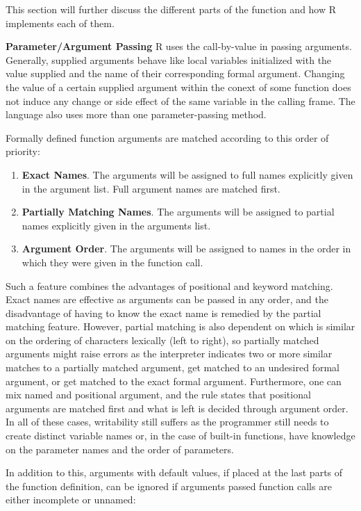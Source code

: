 \documentclass[12pt]{article}
\begin{document}
This section will further discuss the different parts of the function and how R implements each of them.

\textbf{Parameter/Argument Passing} R uses the call-by-value in passing arguments. Generally, supplied arguments behave like local variables initialized with the value supplied and the name of their corresponding formal argument. Changing the value of a certain supplied argument within the conext of some function does not induce any change or side effect of the same variable in the calling frame. The language also uses more than one parameter-passing method.

Formally defined function arguments are matched according to this order of priority:
\begin{enumerate}
\item \textbf{Exact Names}. The arguments will be assigned to full names explicitly given in the argument list. Full argument names are matched first.
\item \textbf{Partially Matching Names}. The arguments will be assigned to partial names explicitly given in the arguments list.
\item \textbf{Argument Order}. The arguments will be assigned to names in the order in which they were given in the function call.
\end{enumerate}

Such a feature combines the advantages of positional and keyword matching. Exact names are effective as arguments can be passed in any order, and the disadvantage of having to know the exact name is remedied by the partial matching feature. However, partial matching is also dependent on which is similar on the ordering of characters lexically (left to right), so partially matched arguments might raise errors as the interpreter indicates two or more similar matches to a partially matched argument, get matched to an undesired formal argument, or get matched to the exact formal argument. Furthermore, one can mix named and positional argument, and the rule states that positional arguments are matched first and what is left is decided through argument order. In all of these cases, writability still suffers as the programmer still needs to create distinct variable names or, in the case of built-in functions, have knowledge on the parameter names and the order of parameters.

In addition to this, arguments with default values, if placed at the last parts of the function definition, can be ignored if arguments passed function calls are either incomplete or unnamed:
\end{document}
